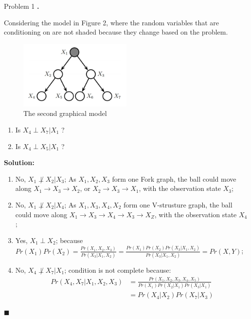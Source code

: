 \documentclass{article}
\newcounter{pcounter}                                   %
\newenvironment{problem}                                %
{                                                       %
    \color{gray}                                        %
    \stepcounter{pcounter}                              %
    \textbf{\arabic{pcounter}.}                         %
}{}                                                     %
\newenvironment{solution}                               %
{\textbf{Solution:} }{$\blacksquare$}                   %
\begin{document}
\begin{section}{Problem 1}
\begin{problem}
            Considering the model in Figure 2, where the random variables that are conditioning on are not shaded because they change based on the problem.
            \begin{figure}[H]
                \label{fig:m2}
                \centering
                \includegraphics[width=0.5\textwidth]{a2_p11_2}
                \caption{The second graphical model}
            \end{figure}
            \begin{enumerate}[label=(\alph*), resume]
                \item Is $X_4 \perp X_7 | X_1$ ?
                \item Is $X_4 \perp X_5 | X_1$ ?
            \end{enumerate}
        \end{problem}

        \begin{solution}
            \begin{enumerate}[label=(\alph*)]
                \item No, $X_1 \not\perp X_2 | X_3$; As $X_1, X_2, X_3$ form one Fork graph, the ball could move along $X_1 \to X_3 \to X_2$, or $X_2 \to X_3 \to X_1$, with the observation state $X_3$;
                
                \item No, $X_1 \not\perp X_2 | X_4$; As $X_1, X_3, X_4, X_2$ form one V-strusture graph, the ball could move along $X_1 \to X_3 \to X_4 \to X_3 \to X_Z$, with the observation state $X_4$;
                
                \item Yes, $X_1 \perp X_2$; because $Pr(X_1) Pr(X_2) = \frac{Pr(X_1, X_2, X_3)}{Pr(X_3|X_1, X_2)} = \frac{Pr(X_1) Pr(X_2) Pr(X_3|X_1,X_2) }{Pr(X_3|X_1, X_2)} = Pr(X, Y)$;
                
                \item No, $X_4 \not\perp X_7 | X_1$; condition is not complete because:
                \begin{align*}
                    Pr(X_4, X_7 | X_1, X_2, X_3) &=
                    \frac{Pr(X_1, X_2, X_3, X_4, X_5)}{Pr(X_1) Pr(X_2|X_1) Pr(X_3|X_1)} \\
                    &= Pr(X_4|X_2) Pr(X_7|X_3)
                \end{align*}
                

\end{enumerate}
\end{solution}
\end{section}
\end{document}
